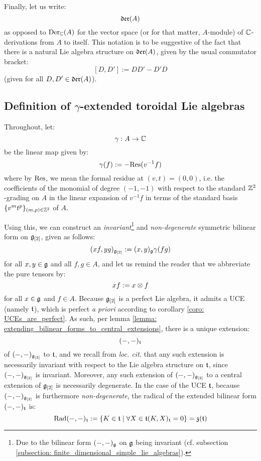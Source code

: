         Finally, let us write:
            $$\mathfrak{der}(A)$$
        as opposed to $\mathrm{Der}_{\mathbb{C}}(A)$ for the vector space (or for that matter, $A$-module) of $\mathbb{C}$-derivations from $A$ to itself. This notation is to be suggestive of the fact that there is a natural Lie algebra structure on $\mathfrak{der}(A)$, given by the usual commutator bracket:
            $$[D, D'] := DD' - D'D$$
        (given for all $D, D' \in \mathfrak{der}(A)$).
    
    \subsection{Definition of \texorpdfstring{$\gamma$}{}-extended toroidal Lie algebras}
        \begin{convention}
            Throughout, let:
                $$\gamma: A \to \mathbb{C}$$
            be the linear map given by:
                $$\gamma(f) := -\mathrm{Res}(v^{-1} f)$$
            where by $\mathrm{Res}$, we mean the formal residue at $(v, t) = (0, 0)$, i.e. the coefficients of the monomial of degree $(-1, -1)$ with respect to the standard $\mathbb{Z}^2$-grading on $A$ in the linear expansion of $v^{-1} f$ in terms of the standard basis $\{v^m t^p\}_{(m, p) \in \mathbb{Z}^2}$ of $A$. 
        \end{convention}
        
        Using this, we can construct an \textit{invariant}\footnote{Due to the bilinear form $(-, -)_{\mathfrak{g}}$ on $\mathfrak{g}$ being invariant (cf. subsection \ref{subsection: finite_dimensional_simple_lie_algebras}).} and \textit{non-degenerate} symmetric bilinear form on $\mathfrak{g}_{[2]}$, given as follows:
            $$(xf, yg)_{\mathfrak{g}_{[2]}} := (x, y)_{\mathfrak{g}} \gamma(fg)$$
        for all $x, y \in \mathfrak{g}$ and all $f, g \in A$, and let us remind the reader that we abbreviate the pure tensors by:
            $$xf := x \tensor f$$
        for all $x \in \mathfrak{g}$ and $f \in A$. Because $\mathfrak{g}_{[2]}$ is a perfect Lie algebra, it admits a UCE (namely $\mathfrak{t}$), which is perfect \textit{a priori} according to corollary \ref{coro: UCEs_are_perfect}. As such, per lemma \ref{lemma: extending_bilinear_forms_to_central_extensions}, there is a unique extension:
            $$(-, -)_{\mathfrak{t}}$$
        of $(-, -)_{\mathfrak{g}_{[2]}}$ to $\mathfrak{t}$, and we recall from \textit{loc. cit.} that any such extension is necessarily invariant with respect to the Lie algebra structure on $\mathfrak{t}$, since $(-, -)_{\mathfrak{g}_{[2]}}$ is invariant. Moreover, any such extension of $(-, -)_{\mathfrak{g}_{[2]}}$ to a central extension of $\mathfrak{g}_{[2]}$ is necessarily degenerate. In the case of the UCE $\mathfrak{t}$, because $(-, -)_{\mathfrak{g}_{[2]}}$ is furthermore \textit{non-degenerate}, the radical of the extended bilinear form $(-, -)_{\mathfrak{t}}$ is:
            $$\operatorname{Rad}(-, -)_{\mathfrak{t}} := \{ K \in \mathfrak{t} \mid \forall X \in \mathfrak{t} (K, X)_{\mathfrak{t}} = 0 \} = \mathfrak{z}(\mathfrak{t})$$
            
